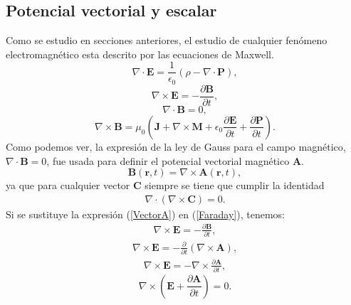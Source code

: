 \documentclass[11pt,fleqn]{book} %
\begin{document}
\subsection{Potencial vectorial y escalar}
Como se estudio en secciones anteriores, el estudio de cualquier fen\'omeno electromagn\'etico esta descrito por las ecuaciones de Maxwell.
\begin{equation}
\nabla \cdot \textbf{E}=\frac{1}{\epsilon_{0}}(\rho-\nabla\cdot\textbf{P}),
 \end{equation}
 \begin{equation}
 \nabla \times \textbf{E}=-\frac{\partial \textbf{B}}{\partial t},
 \end{equation}
 \begin{equation}
 \nabla \cdot \textbf{B}=0,
 \end{equation}
 \begin{equation}
\nabla \times \textbf{B}=\mu_{0}\left( \textbf{J}+\nabla \times \textbf{M}+\epsilon_{0}\frac{\partial \textbf{E}}{\partial t}+\frac{\partial \textbf{P}}{\partial t}\right).
 \end{equation}
Como podemos ver, la expresi\'on de la ley de Gauss para el campo magn\'etico, $\nabla \cdot \textbf{B}=0$, fue usada para definir el potencial vectorial magn\'etico $\textbf{A}$.
\begin{equation}
 \textbf{B}(\textbf{r},t)=\nabla \times \textbf{A}(\textbf{r},t),  \label{VectorA}
 \end{equation}
 ya que para cualquier vector $\textbf{C}$ siempre se tiene que cumplir la identidad
 \begin{eqnarray*}
 \nabla \cdot(\nabla \times \textbf{C})=0.
 \end{eqnarray*}
 Si se sustituye la expresi\'on (\ref{VectorA}) en (\ref{Faraday}), tenemos:
 \begin{eqnarray*}
 \nabla \times \textbf{E}=-\frac{\partial \textbf{B}}{\partial t},
 \end{eqnarray*}
 \begin{eqnarray*}
 \nabla \times \textbf{E}=-\frac{\partial}{\partial t}\left( \nabla  \times \textbf{A} \right),
 \end{eqnarray*}
 \begin{eqnarray*}
 \nabla \times \textbf{E}=-\nabla \times \frac{\partial \textbf{A}}{\partial t},
 \end{eqnarray*}
  \begin{equation}
\nabla \times \left( \textbf{E}+\frac{\partial \textbf{A}}{\partial t} \right)=0. \label{potencial}
  \end{equation}
\end{document}

